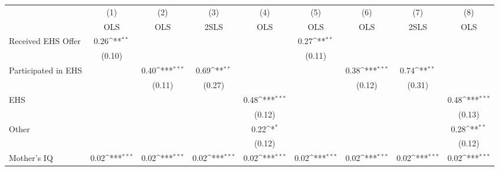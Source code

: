 {
\def\sym#1{\ifmmode^{#1}\else\(^{#1}\)\fi}
\begin{tabular}{l*{8}{c}}
\hline\hline
                    &\multicolumn{1}{c}{(1)}&\multicolumn{1}{c}{(2)}&\multicolumn{1}{c}{(3)}&\multicolumn{1}{c}{(4)}&\multicolumn{1}{c}{(5)}&\multicolumn{1}{c}{(6)}&\multicolumn{1}{c}{(7)}&\multicolumn{1}{c}{(8)}\\
                    &\multicolumn{1}{c}{OLS}&\multicolumn{1}{c}{OLS}&\multicolumn{1}{c}{2SLS}&\multicolumn{1}{c}{OLS}&\multicolumn{1}{c}{OLS}&\multicolumn{1}{c}{OLS}&\multicolumn{1}{c}{2SLS}&\multicolumn{1}{c}{OLS}\\
\hline
Received EHS Offer  &        0.26\sym{**} &                     &                     &                     &        0.27\sym{**} &                     &                     &                     \\
                    &      (0.10)         &                     &                     &                     &      (0.11)         &                     &                     &                     \\
[1em]
Participated in EHS &                     &        0.40\sym{***}&        0.69\sym{**} &                     &                     &        0.38\sym{***}&        0.74\sym{**} &                     \\
                    &                     &      (0.11)         &      (0.27)         &                     &                     &      (0.12)         &      (0.31)         &                     \\
[1em]
EHS                 &                     &                     &                     &        0.48\sym{***}&                     &                     &                     &        0.48\sym{***}\\
                    &                     &                     &                     &      (0.12)         &                     &                     &                     &      (0.13)         \\
[1em]
Other               &                     &                     &                     &        0.22\sym{*}  &                     &                     &                     &        0.28\sym{**} \\
                    &                     &                     &                     &      (0.12)         &                     &                     &                     &      (0.12)         \\
[1em]
Mother's IQ         &        0.02\sym{***}&        0.02\sym{***}&        0.02\sym{***}&        0.02\sym{***}&        0.02\sym{***}&        0.02\sym{***}&        0.02\sym{***}&        0.02\sym{***}\\

\end{tabular}}
